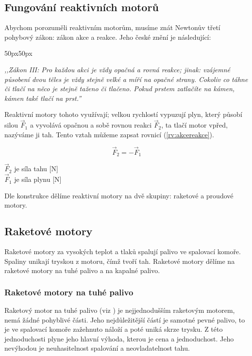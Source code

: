 \subsection{Fungování reaktivních motorů}\label{sc:AkceReakce}
{Abychom porozuměli reaktivním motorům, musíme znát Newtonův třetí pohybový zákon: zákon akce a reakce. Jeho české znění je následující:}
\cite{MIT:NewtonsLawsOfMotion}
\begin{changemargin}{50px}{50px}
    \begin{center}
        \textit{,,Zákon III: Pro každou akci je vždy opačná a rovná reakce; jinak: vzájemné působení dvou těles je vždy stejně velké a míří na opačné strany. Cokoliv co táhne či tlačí na něco je stejně taženo či tlačeno. Pokud prstem zatlačíte na kámen, kámen také tlačí na prst.''}
        \cite{MIT:NewtonsLawsOfMotion}
    \end{center}
\end{changemargin}
{Reaktivní motory tohoto využívají; velkou rychlostí vypuzují plyn, který působí silou \(\vec{F}_{1}\) a vyvolává opačnou a sobě rovnou reakci \(\vec{F}_{2}\), ta tlačí motor vpřed, nazýváme ji tah. Tento vztah můžeme zapsat rovnicí (\ref{rv:akcereakce}).}
\cite{MIT:NewtonsLawsOfMotion}

\begin{equation} \label{rv:akcereakce}
    \vec{F}_{2}=-\vec{F}_{1}
\end{equation}

{\(\vec{F}_{2}\) je síla tahu [N]}\\
{\(\vec{F}_{1}\) je síla plynu [N]}\odst

{Dle konstrukce dělíme reaktivní motory na dvě skupiny: raketové a proudové motory.}
\cite{VUTB:PrehledTechnickychAspektuVyvojeLeteckychProudovychMotoru}

\newpage

\subsection{Raketové motory}
{Raketové motory za vysokých teplot a tlaků spalují palivo ve spalovací komoře. Spaliny unikají tryskou z motoru, čímž tvoří tah.}
\cite{VUTB:NavrhRaketovehoMotoru}\odst
{Raketové motory dělíme na raketové motory na tuhé palivo a na kapalné palivo.}
\cite{VUTB:NavrhRaketovehoMotoru}

\subsubsection{Raketové motory na tuhé palivo}
{Raketový motor na tuhé palivo (viz ) je nejjednodušším raketovým motorem, nemá žádné pohyblivé části. Jeho nejdůležitější částí je samotné pevné palivo, to je ve spalovací komoře zažehnuto náloží a poté uniká skrze trysku. Z této jednoduchosti plyne jeho hlavní výhoda, kterou je cena a jednoduchost. Jeho nevýhodou je neuhasitelnost spalování a neovladatelnost tahu.}
\cite{VUTB:NavrhRaketovehoMotoru}


